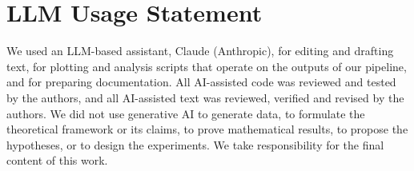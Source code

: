 \documentclass[10pt,twocolumn,letterpaper]{article}
\begin{document}
\section*{LLM Usage Statement}
We used an LLM-based assistant, Claude (Anthropic), for editing and drafting text, for plotting and analysis scripts that operate on the outputs of our pipeline, and for preparing documentation. All AI-assisted code was reviewed and tested by the authors, and all AI-assisted text was reviewed, verified and revised by the authors. We did not use generative AI to generate data, to formulate the theoretical framework or its claims, to prove mathematical results, to propose the hypotheses, or to design the experiments. We take responsibility for the final content of this work.

{
    \small
    
    
}
\end{document}
